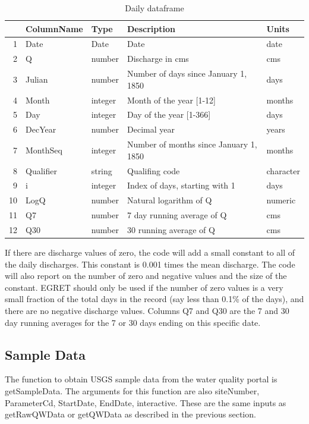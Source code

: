 \documentclass[a4paper,11pt]{article}\usepackage[]{graphicx}\usepackage[]{color}
\begin{document}
\begin{table}[ht]
\centering
\begin{tabular}{rllll}
  \hline
 & ColumnName & Type & Description & Units \\ 
  \hline
1 & Date & Date & Date & date \\ 
  2 & Q & number & Discharge in cms & cms \\ 
  3 & Julian & number & Number of days since January 1, 1850 & days \\ 
  4 & Month & integer & Month of the year [1-12] & months \\ 
  5 & Day & integer & Day of the year [1-366] & days \\ 
  6 & DecYear & number & Decimal year & years \\ 
  7 & MonthSeq & integer & Number of months since January 1, 1850 & months \\ 
  8 & Qualifier & string & Qualifing code & character \\ 
  9 & i & integer & Index of days, starting with 1 & days \\ 
  10 & LogQ & number & Natural logarithm of Q & numeric \\ 
  11 & Q7 & number & 7 day running average of Q & cms \\ 
  12 & Q30 & number & 30 running average of Q & cms \\ 
   \hline
\end{tabular}
\caption{Daily dataframe} 
\end{table}




If there are discharge values of zero, the code will add a small constant to all of the daily discharges.  This constant is 0.001 times the mean discharge.  The code will also report on the number of zero and negative values and the size of the constant.  EGRET should only be used if the number of zero values is a very small fraction of the total days in the record (say less than 0.1\% of the days), and there are no negative discharge values.  Columns Q7 and Q30 are the 7 and 30 day running averages for the 7 or 30 days ending on this specific date.

\FloatBarrier

\subsection{Sample Data}
The function to obtain USGS sample data from the water quality portal is getSampleData. The arguments for this function are also siteNumber, ParameterCd, StartDate, EndDate, interactive. These are the same inputs as getRawQWData or getQWData as described in the previous section.
\end{document}
